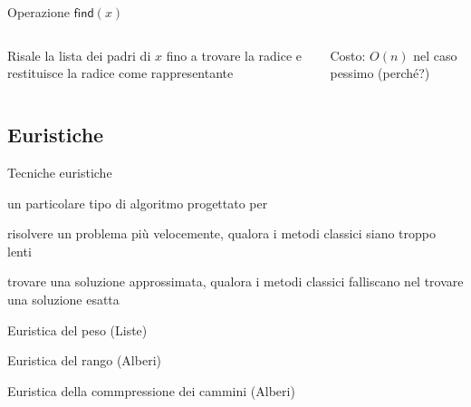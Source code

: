 \begin{frame}{Operazione $\textsf{find}(x)$}

\vspace{-9pt}
\begin{columns}[T]
\BIL
\item Risale la lista dei padri di $x$ fino a trovare la radice e 
restituisce la radice come rappresentante
\item Costo: $O(n)$ nel caso pessimo (perché?)
\EIL
{}
\vspace{-9pt}
\end{columns}

\end{frame}

\subsection{Euristiche}

\begin{frame}{Tecniche euristiche}

\vspace{-9pt}
\begin{myboxtitle}
\EE un particolare tipo di algoritmo progettato per 
\BI
\item risolvere un problema  più velocemente, qualora i metodi classici 
siano troppo lenti
\item trovare una soluzione approssimata, qualora i metodi classici 
falliscano nel trovare una soluzione esatta
\EI
\end{myboxtitle}

\begin{myboxtitle}
\BIL
\item Euristica del \alert{peso} (Liste)
\item Euristica del \alert{rango} (Alberi)
\item Euristica della \alert{commpressione dei cammini} (Alberi)
\EIL
\end{myboxtitle}

\end{frame}


